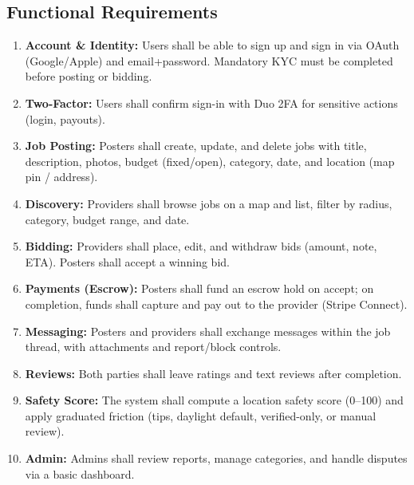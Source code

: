 \documentclass[11pt]{article}
\begin{document}
\subsection{Functional Requirements}
\begin{enumerate}[leftmargin=1.4em]
  \item \textbf{Account \& Identity:} Users shall be able to sign up and sign in via OAuth (Google/Apple) and email+password. Mandatory KYC must be completed before posting or bidding.
  \item \textbf{Two-Factor:} Users shall confirm sign-in with Duo 2FA for sensitive actions (login, payouts).
  \item \textbf{Job Posting:} Posters shall create, update, and delete jobs with title, description, photos, budget (fixed/open), category, date, and location (map pin / address).
  \item \textbf{Discovery:} Providers shall browse jobs on a map and list, filter by radius, category, budget range, and date.
  \item \textbf{Bidding:} Providers shall place, edit, and withdraw bids (amount, note, ETA). Posters shall accept a winning bid.
  \item \textbf{Payments (Escrow):} Posters shall fund an escrow hold on accept; on completion, funds shall capture and pay out to the provider (Stripe Connect).
  \item \textbf{Messaging:} Posters and providers shall exchange messages within the job thread, with attachments and report/block controls.
  \item \textbf{Reviews:} Both parties shall leave ratings and text reviews after completion.
  \item \textbf{Safety Score:} The system shall compute a location safety score (0--100) and apply graduated friction (tips, daylight default, verified-only, or manual review).
  \item \textbf{Admin:} Admins shall review reports, manage categories, and handle disputes via a basic dashboard.
\end{enumerate}
\end{document}
